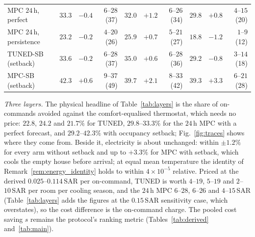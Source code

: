 \documentclass[pdflatex,sn-mathphys-num,iicol]{sn-jnl}
\theoremstyle{thmstyleone}\newtheorem{proposition}{Proposition}\newtheorem{corollary}{Corollary}
\theoremstyle{thmstyletwo}\newtheorem{remark}{Remark}\newtheorem{observation}{Observation}
\theoremstyle{thmstylethree}\newtheorem{definition}{Definition}
\newcommand{\SAR}{\text{SAR}}
\begin{document}
\begin{table}[t]
\begin{tabular*}{\textwidth}{@{\extracolsep{\fill}}lrrrrrrrrr@{}}
MPC $24\,$h, perfect & $33.3$ & $-0.4$ & $6$--$28$ (37) & $32.0$ & $+1.2$ & $6$--$26$ (34) & $29.8$ & $+0.8$ & $4$--$15$ (20) \\
MPC $24\,$h, persistence & $23.2$ & $-0.2$ & $4$--$20$ (26) & $25.9$ & $+0.7$ & $5$--$21$ (27) & $18.8$ & $-1.2$ & $1$--$9$ (12) \\
TUNED-SB (setback) & $33.6$ & $-0.2$ & $6$--$28$ (37) & $35.0$ & $+0.6$ & $6$--$28$ (36) & $29.2$ & $-0.8$ & $3$--$14$ (18) \\
MPC-SB (setback) & $42.3$ & $+0.6$ & $9$--$37$ (49) & $39.7$ & $+2.1$ & $8$--$33$ (42) & $39.3$ & $+3.3$ & $6$--$21$ (28) \\
\bottomrule
\end{tabular*}
\end{table}

\emph{Three layers.} The physical headline of Table~\ref{tab:layers} is the share of on-commands avoided against the comfort-equalised thermostat, which needs no price: $22.8$, $24.2$ and $21.7\%$ for TUNED, $29.8$--$33.3\%$ for the $24\,$h MPC with a perfect forecast, and $29.2$--$42.3\%$ with occupancy setback; Fig.~\ref{fig:traces} shows where they come from. Beside it, electricity is about unchanged: within $\pm1.2\%$ for every arm without setback and up to $+3.3\%$ for MPC with setback, which cools the empty house before arrival; at equal mean temperature the identity of Remark~\ref{rem:energy_identity} holds to within $4\times10^{-5}$ relative. Priced at the derived $0.025$--$0.114\,\SAR$ per on-command, TUNED is worth $4$--$19$, $5$--$19$ and $2$--$10\,\SAR$ per room per cooling season, and the $24\,$h MPC $6$--$28$, $6$--$26$ and $4$--$15\,\SAR$ (Table~\ref{tab:layers} adds the figures at the $0.15\,\SAR$ sensitivity case, which overstates), so the cost difference is the on-command charge. The pooled cost saving $s$ remains the protocol's ranking metric (Tables~\ref{tab:derived} and~\ref{tab:main}).


\end{document}
